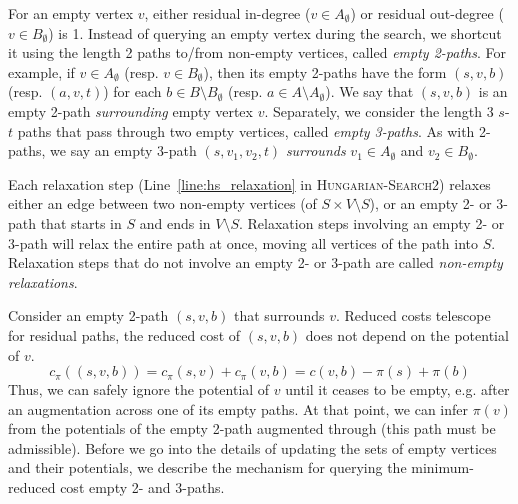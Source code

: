 \documentclass[11pt]{article}
\theoremstyle{plain}
\begin{document}
For an empty vertex $v$, either residual in-degree ($v \in A_\emptyset$) or
residual out-degree ($v \in B_\emptyset$) is 1.
Instead of querying an empty vertex during the search, we shortcut it using the
length 2 paths to/from non-empty vertices, called \emph{empty 2-paths}.
For example, if $v \in A_\emptyset$ (resp. $v \in B_\emptyset$), then its empty
2-paths have the form $(s, v, b)$ (resp. $(a, v, t)$) for each
$b \in B \setminus B_\emptyset$ (resp. $a \in A \setminus A_\emptyset$).
We say that $(s, v, b)$ is an empty 2-path \emph{surrounding} empty vertex $v$.
Separately, we consider the length 3 $s$-$t$ paths that pass through two empty
vertices, called \emph{empty 3-paths}.
As with 2-paths, we say an empty 3-path $(s, v_1, v_2, t)$ \emph{surrounds}
$v_1 \in A_\emptyset$ and $v_2 \in B_\emptyset$.

Each relaxation step (Line~\ref{line:hs_relaxation} in 
\textsc{Hungarian-Search2}) relaxes either an edge between two non-empty 
vertices (of $S \times V \setminus S$), or an empty 2- or 3-path that starts
in $S$ and ends in $V \setminus S$.
Relaxation steps involving an empty 2- or 3-path will relax the entire path
at once, moving all vertices of the path into $S$.
Relaxation steps that do not involve an empty 2- or 3-path are called
\emph{non-empty relaxations}.

Consider an empty 2-path $(s, v, b)$ that surrounds $v$.
Reduced costs telescope for residual paths, the reduced cost of $(s, v, b)$
does not depend on the potential of $v$.
\begin{equation*}
	c_\pi((s, v, b)) = c_\pi(s, v) + c_\pi(v, b) = c(v, b) - \pi(s) + \pi(b)
\end{equation*}
Thus, we can safely ignore the potential of $v$ until it ceases to be
empty, e.g. after an augmentation across one of its empty paths.
At that point, we can infer $\pi(v)$ from the potentials of the empty 2-path
augmented through (this path must be admissible).
Before we go into the details of updating the sets of empty vertices and their
potentials, we describe the mechanism for querying the minimum-reduced cost
empty 2- and 3-paths.
\end{document}
